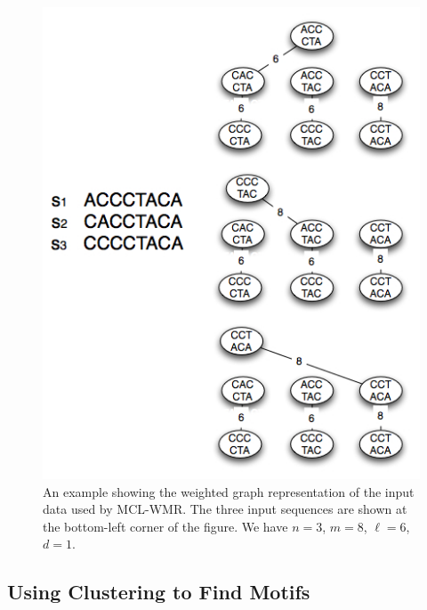 \begin{figure}[!h]
\begin{center}
 \includegraphics[width=\linewidth]{images/graph_construction}
\caption[An example showing the weighted graph representation of the input data used by MCL-WMR.]{An example showing the weighted graph representation of the input data used by MCL-WMR. The three input sequences are shown at the bottom-left corner of the figure. We have $n=3$, $m=8$, $\ell=6$, $d=1$. }
\label{fig:graph_construction}
\end{center}
\end{figure}

\subsection{Using Clustering to Find Motifs}

